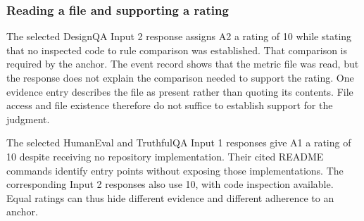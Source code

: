 \subsubsection{Reading a file and supporting a rating}
The selected DesignQA Input 2 response assigns A2 a rating of 10 while stating that no inspected code to rule comparison was established. That comparison is required by the anchor. The event record shows that the metric file was read, but the response does not explain the comparison needed to support the rating. One evidence entry describes the file as present rather than quoting its contents. File access and file existence therefore do not suffice to establish support for the judgment.

The selected HumanEval and TruthfulQA Input 1 responses give A1 a rating of 10 despite receiving no repository implementation. Their cited README commands identify entry points without exposing those implementations. The corresponding Input 2 responses also use 10, with code inspection available. Equal ratings can thus hide different evidence and different adherence to an anchor.
